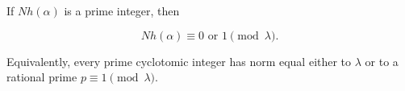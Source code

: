 If $Nh(\alpha)$ is a prime integer, then

$$Nh(\alpha) \equiv 0 \text{ or } 1 \pmod{\lambda}.$$

Equivalently, every prime cyclotomic integer has norm equal either to $\lambda$ or to a rational prime $p \equiv 1 \pmod{\lambda}$.
